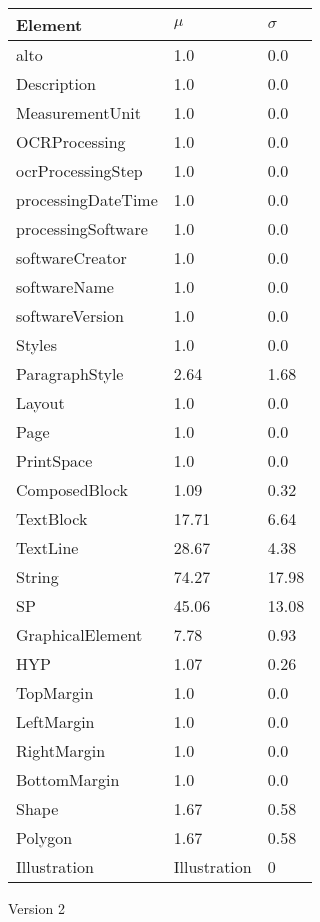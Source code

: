 \begin{figure}[H]
\centering
\begin{footnotesize}
\begin{tabular}{lll}
\hline\hline
Element & $\mu$ & $\sigma$\\
\hline
alto & 1.0 & 0.0 \\
Description & 1.0 & 0.0 \\
MeasurementUnit & 1.0 & 0.0 \\
OCRProcessing & 1.0 & 0.0 \\
ocrProcessingStep & 1.0 & 0.0 \\
processingDateTime & 1.0 & 0.0 \\
processingSoftware & 1.0 & 0.0 \\
softwareCreator & 1.0 & 0.0 \\
softwareName & 1.0 & 0.0 \\
softwareVersion & 1.0 & 0.0 \\
Styles & 1.0 & 0.0 \\
ParagraphStyle & 2.64 & 1.68 \\
Layout & 1.0 & 0.0 \\
Page & 1.0 & 0.0 \\
PrintSpace & 1.0 & 0.0 \\
ComposedBlock & 1.09 & 0.32 \\
TextBlock & 17.71 & 6.64 \\
TextLine & 28.67 & 4.38 \\
String & 74.27 & 17.98 \\
SP & 45.06 & 13.08 \\
GraphicalElement & 7.78 & 0.93 \\
HYP & 1.07 & 0.26 \\
TopMargin & 1.0 & 0.0 \\
LeftMargin & 1.0 & 0.0 \\
RightMargin & 1.0 & 0.0 \\
BottomMargin & 1.0 & 0.0 \\
Shape & 1.67 & 0.58 \\
Polygon & 1.67 & 0.58 \\
Illustration & Illustration & 0 \\
\hline\hline
\end{tabular}
\end{footnotesize}
\begin{quote}
\caption{Version 2}
\end{quote}
\end{figure}
